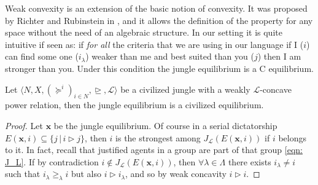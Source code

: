 Weak convexity is an extension of the basic notion of convexity. It was proposed by Richter and Rubinstein in \cite[RR]{Convex_Pref}, and it allows the definition of the property for any space without the need of an algebraic structure. In our setting it is quite intuitive if seen as: if \textit{for all} the criteria that we are using in our language if I ($i$) can find some one ($i_{\lambda}$) weaker than me and best suited than you ($j$) then I am stronger than you. Under this condition the jungle equilibrium is a C equilibrium.



\begin{proposition}\label{Prop: undivisible, weakly concave L}
    Let $\langle N,X,(\succeq^i)_{i\in N}, \trianglerighteq, \mathcal{L}\rangle$ be a civilized jungle with a weakly $\mathcal{L}$-concave power relation, then the jungle equilibrium is a civilized equilibrium.

    \begin{proof}
        Let $\textbf{x}$ be the jungle equilibrium. Of course in a serial dictatorship $E(\textbf{x},i)\subseteq\{j\,|\,i\triangleright j\}$, then $i$ is the strongest among $J_{\mathcal{L}}(E(\textbf{x},i))$ if $i$ belongs to it. In fact, recall that justified agents in a group are part of that group \cref{eqn: J_L}. If by contradiction $i\notin J_{\mathcal{L}}(E(\textbf{x},i))$, then $\forall\lambda\in\Lambda$ there exists $i_{\lambda}\neq i$ such that $i_{\lambda}\geq_{\lambda}i$ but also $i\triangleright i_{\lambda}$, and so by weak concavity $i\triangleright i$.   
    \end{proof}
\end{proposition}



